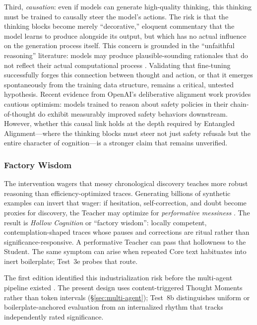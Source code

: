 Third, \emph{causation}: even if models can generate high-quality thinking, this thinking must be trained to causally steer the model's actions. The risk is that the thinking blocks become merely ``decorative,'' eloquent commentary that the model learns to produce alongside its output, but which has no actual influence on the generation process itself. This concern is grounded in the ``unfaithful reasoning'' literature: models may produce plausible-sounding rationales that do not reflect their actual computational process \cite{turpin2023language, lanham2023measuring}. Validating that fine-tuning successfully forges this connection between thought and action, or that it emerges spontaneously from the training data structure, remains a critical, untested hypothesis. Recent evidence from OpenAI's deliberative alignment work \cite{guan2024deliberative} provides cautious optimism: models trained to reason about safety policies in their chain-of-thought do exhibit measurably improved safety behaviors downstream. However, whether this causal link holds at the depth required by Entangled Alignment---where the thinking blocks must steer not just safety refusals but the entire character of cognition---is a stronger claim that remains unverified.

\subsubsection{Factory Wisdom}
\label{sec:hollow-cognition}

The intervention wagers that messy chronological discovery teaches more robust
reasoning than efficiency-optimized traces. Generating billions of synthetic
examples can invert that wager: if hesitation, self-correction, and doubt become
proxies for discovery, the Teacher may optimize for \emph{performative messiness}
\cite{shumailov2023curse}. The result is \emph{Hollow Cognition} or ``factory
wisdom'': locally competent, contemplation-shaped traces whose pauses and
corrections are ritual rather than significance-responsive. A performative
Teacher can pass that hollowness to the Student. The same symptom can arise when
repeated Core text habituates into inert boilerplate; Test~3e probes that route.

The first edition identified this industrialization risk before the multi-agent
pipeline existed \cite{westerberg2025superintelligence}. The present design uses
content-triggered Thought Moments rather than token intervals
(\S\ref{sec:multi-agent}); Test~8b distinguishes uniform or boilerplate-anchored
evaluation from an internalized rhythm that tracks independently rated
significance.

